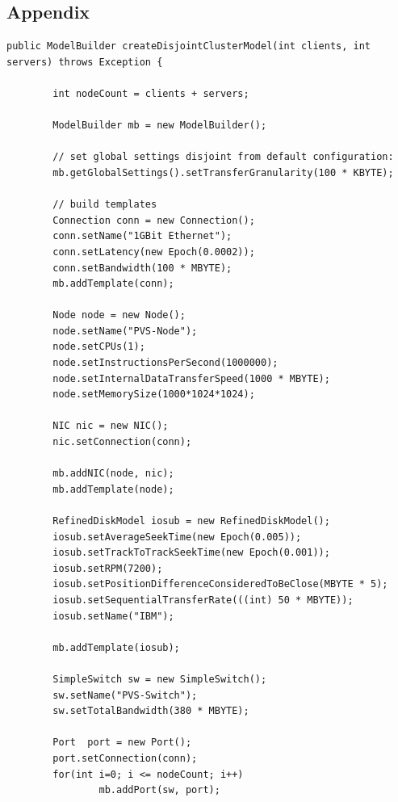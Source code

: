 \documentclass[
     11pt,         %
     a4paper,      %
     BCOR10mm,     %
     DIV14,        %
     liststotoc,   %
     bibtotoc,     %
     idxtotoc,     %
     parskip       %
     ]{scrreprt}   %
\begin{document}




\begin{appendix}
\chapter{Appendix}

\begin{lstlisting}[numbers=none,caption=Example code to build a disjoint client and server cluster model,label=lst:exampleClusterBuild,basicstyle=\ttfamily\scriptsize]
public ModelBuilder createDisjointClusterModel(int clients, int servers) throws Exception {

        int nodeCount = clients + servers;

        ModelBuilder mb = new ModelBuilder();

        // set global settings disjoint from default configuration:
        mb.getGlobalSettings().setTransferGranularity(100 * KBYTE);

        // build templates
        Connection conn = new Connection();
        conn.setName("1GBit Ethernet");
        conn.setLatency(new Epoch(0.0002));
        conn.setBandwidth(100 * MBYTE);
        mb.addTemplate(conn);

        Node node = new Node();
        node.setName("PVS-Node");
        node.setCPUs(1);
        node.setInstructionsPerSecond(1000000);
        node.setInternalDataTransferSpeed(1000 * MBYTE);
        node.setMemorySize(1000*1024*1024);

        NIC nic = new NIC();
        nic.setConnection(conn);

        mb.addNIC(node, nic);
        mb.addTemplate(node);

        RefinedDiskModel iosub = new RefinedDiskModel();
        iosub.setAverageSeekTime(new Epoch(0.005));
        iosub.setTrackToTrackSeekTime(new Epoch(0.001));
        iosub.setRPM(7200);
        iosub.setPositionDifferenceConsideredToBeClose(MBYTE * 5);
        iosub.setSequentialTransferRate(((int) 50 * MBYTE));
        iosub.setName("IBM");

        mb.addTemplate(iosub);

        SimpleSwitch sw = new SimpleSwitch();
        sw.setName("PVS-Switch");
        sw.setTotalBandwidth(380 * MBYTE);

        Port  port = new Port();
        port.setConnection(conn);
        for(int i=0; i <= nodeCount; i++)
                mb.addPort(sw, port);


\end{lstlisting}
\end{appendix}
\end{document}
